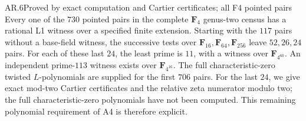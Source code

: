 \begin{claim}{AR.6}{Proved by exact computation and Cartier certificates; all F4 pointed pairs}
Every one of the $730$ pointed pairs in the complete $\mathbf F_4$
genus-two census has a rational L1 witness over a specified finite
extension. Starting with the $117$ pairs without a base-field witness,
the successive tests over $\mathbf F_{16},\mathbf F_{64},\mathbf F_{256}$
leave $52,26,24$ pairs. For each of these last $24$, the least prime is
$11$, with a witness over $\mathbf F_{4^{60}}$. An independent
prime-$113$ witness exists over $\mathbf F_{4^{16}}$.
The full characteristic-zero twisted $L$-polynomials are supplied for
the first $706$ pairs. For the last $24$, we give exact mod-two
Cartier certificates and the relative zeta numerator modulo two;
the full characteristic-zero polynomials have not been computed.
This remaining polynomial requirement of A4 is therefore explicit.
\end{claim}
